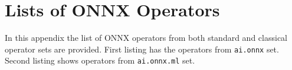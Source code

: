 \documentclass[english, 12pt, a4paper, elec, utf8, online]{aaltothesis}
\begin{document}




\clearpage

\thesisbibliography
{}




\clearpage
\thesisappendix
\section{Lists of ONNX Operators\label{appendix:operatorlist}}
In this appendix the list of ONNX operators from both standard and classical operator sets are provided. First listing has the operators from \texttt{ai.onnx} set. Second listing  shows operators from \texttt{ai.onnx.ml} set.  


\end{document}
